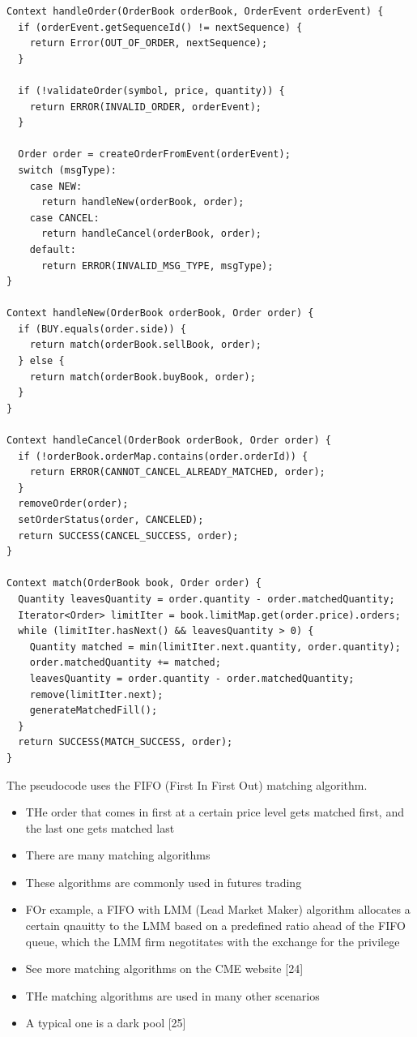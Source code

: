 \documentclass{report}
\theoremstyle{definition}
\begin{document}
\begin{lstlisting}
Context handleOrder(OrderBook orderBook, OrderEvent orderEvent) {
  if (orderEvent.getSequenceId() != nextSequence) {
    return Error(OUT_OF_ORDER, nextSequence);
  }

  if (!validateOrder(symbol, price, quantity)) {
    return ERROR(INVALID_ORDER, orderEvent);
  }

  Order order = createOrderFromEvent(orderEvent);
  switch (msgType):
    case NEW:
      return handleNew(orderBook, order);
    case CANCEL:
      return handleCancel(orderBook, order);
    default:
      return ERROR(INVALID_MSG_TYPE, msgType);
}

Context handleNew(OrderBook orderBook, Order order) {
  if (BUY.equals(order.side)) {
    return match(orderBook.sellBook, order);
  } else {
    return match(orderBook.buyBook, order);
  }
}

Context handleCancel(OrderBook orderBook, Order order) {
  if (!orderBook.orderMap.contains(order.orderId)) {
    return ERROR(CANNOT_CANCEL_ALREADY_MATCHED, order);
  }
  removeOrder(order);
  setOrderStatus(order, CANCELED);
  return SUCCESS(CANCEL_SUCCESS, order);
}

Context match(OrderBook book, Order order) {
  Quantity leavesQuantity = order.quantity - order.matchedQuantity;
  Iterator<Order> limitIter = book.limitMap.get(order.price).orders;
  while (limitIter.hasNext() && leavesQuantity > 0) {
    Quantity matched = min(limitIter.next.quantity, order.quantity);
    order.matchedQuantity += matched;
    leavesQuantity = order.quantity - order.matchedQuantity;
    remove(limitIter.next);
    generateMatchedFill();
  }
  return SUCCESS(MATCH_SUCCESS, order);
}
\end{lstlisting}

The pseudocode uses the FIFO (First In First Out) matching algorithm.

\begin{itemize}
\item
THe order that comes in first at a certain price level gets matched first, and the last one gets matched last
\item
There are many matching algorithms
\item
These algorithms are commonly used in futures trading
\item
FOr example, a FIFO with LMM (Lead Market Maker) algorithm allocates a certain qnauitty to the LMM based on a predefined ratio ahead of the FIFO queue, which the LMM firm negotitates with the exchange for the privilege
\item
See more matching algorithms on the CME website [24]
\item
THe matching algorithms are used in many other scenarios
\item
A typical one is a dark pool [25]
\end{itemize}
\end{document}
